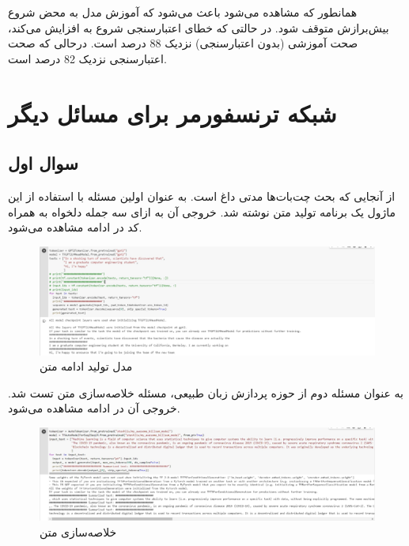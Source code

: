 \documentclass{article}
\begin{document}
همانطور که مشاهده می‌شود  باعث می‌شود که آموزش مدل به محض شروع بیش‌برازش متوقف شود. در حالتی که خطای اعتبارسنجی شروع به افزایش می‌کند، صحت آموزشی (بدون اعتبارسنجی) نزدیک 88 درصد است. درحالی که صحت اعتبارسنجی نزدیک 82 درصد است.

\cleardoublepage



\section{شبکه ترنسفورمر برای مسائل دیگر}
\subsection{سوال اول}


از آنجایی که بحث چت‌بات‌ها مدتی داغ است. به عنوان اولین مسئله با استفاده از این ماژول یک برنامه تولید متن نوشته شد. خروجی آن به ازای سه جمله دلخواه به همراه کد در ادامه مشاهده می‌شود.
\begin{figure}[!h]
    \centering\includegraphics[scale=.40]{./p3-1}
    \caption{مدل تولید ادامه متن}\label{fig.31}
\end{figure}
\cleardoublepage

به عنوان مسئله دوم از حوزه پردازش زبان طبیعی، مسئله خلاصه‌سازی متن تست شد. خروجی آن در ادامه مشاهده می‌شود.

\begin{figure}[!h]
    \centering\includegraphics[scale=.40]{./p3-2}
    \caption{خلاصه‌سازی متن}\label{fig.32}
\end{figure}
\end{document}
